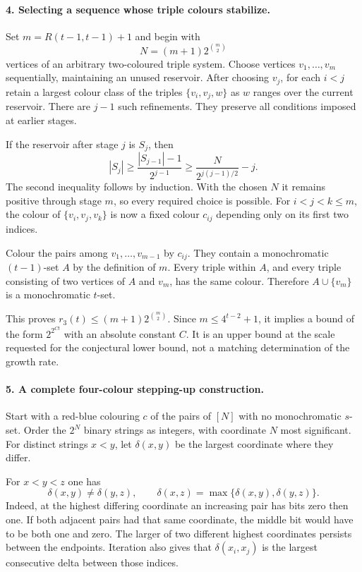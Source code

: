 \documentclass[11pt]{article}
\begin{document}
\paragraph{4. Selecting a sequence whose triple colours stabilize.}
Set $m=R(t-1,t-1)+1$ and begin with
\[
 N=(m+1)2^{\binom m2}
\]
vertices of an arbitrary two-coloured triple system. Choose vertices $v_1,\ldots,v_m$ sequentially, maintaining an unused reservoir. After choosing $v_j$, for each $i<j$ retain a largest colour class of the triples $\{v_i,v_j,w\}$ as $w$ ranges over the current reservoir. There are $j-1$ such refinements. They preserve all conditions imposed at earlier stages.

If the reservoir after stage $j$ is $S_j$, then
\[
 |S_j|\ge\frac{|S_{j-1}|-1}{2^{j-1}}
 \ge\frac{N}{2^{j(j-1)/2}}-j.
\]
The second inequality follows by induction. With the chosen $N$ it remains positive through stage $m$, so every required choice is possible. For $i<j<k\le m$, the colour of $\{v_i,v_j,v_k\}$ is now a fixed colour $c_{ij}$ depending only on its first two indices.

Colour the pairs among $v_1,\ldots,v_{m-1}$ by $c_{ij}$. They contain a monochromatic $(t-1)$-set $A$ by the definition of $m$. Every triple within $A$, and every triple consisting of two vertices of $A$ and $v_m$, has the same colour. Therefore $A\cup\{v_m\}$ is a monochromatic $t$-set.

This proves $r_3(t)\le(m+1)2^{\binom m2}$. Since $m\le4^{t-2}+1$, it implies a bound of the form $2^{2^{Ct}}$ with an absolute constant $C$. It is an upper bound at the scale requested for the conjectural lower bound, not a matching determination of the growth rate.

\paragraph{5. A complete four-colour stepping-up construction.}
Start with a red-blue colouring $c$ of the pairs of $[N]$ with no monochromatic $s$-set. Order the $2^N$ binary strings as integers, with coordinate $N$ most significant. For distinct strings $x<y$, let $\delta(x,y)$ be the largest coordinate where they differ.

For $x<y<z$ one has
\[
 \delta(x,y)\ne\delta(y,z),\qquad
 \delta(x,z)=\max\{\delta(x,y),\delta(y,z)\}.
\]
Indeed, at the highest differing coordinate an increasing pair has bits zero then one. If both adjacent pairs had that same coordinate, the middle bit would have to be both one and zero. The larger of two different highest coordinates persists between the endpoints. Iteration also gives that $\delta(x_i,x_j)$ is the largest consecutive delta between those indices.
\end{document}
